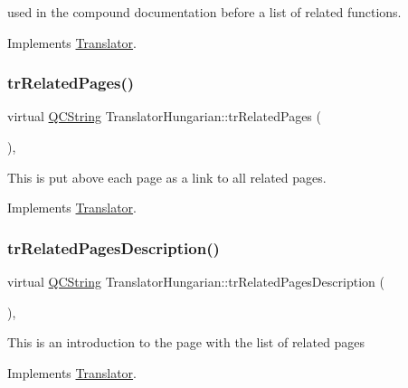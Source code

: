 used in the compound documentation before a list of related functions. 

Implements \mbox{\hyperlink{class_translator}{Translator}}.

\mbox{\label{class_translator_hungarian_a416efd9bfe237419500bd8aac47fb992}} 
\subsubsection{\texorpdfstring{trRelatedPages()}{trRelatedPages()}}
{\footnotesize\ttfamily virtual \mbox{\hyperlink{class_q_c_string}{Q\+C\+String}} Translator\+Hungarian\+::tr\+Related\+Pages (\begin{DoxyParamCaption}{ }\end{DoxyParamCaption})\hspace{0.3cm}{\ttfamily [inline]}, {\ttfamily [virtual]}}

This is put above each page as a link to all related pages. 

Implements \mbox{\hyperlink{class_translator}{Translator}}.

\mbox{\label{class_translator_hungarian_a1870d40281b97fa9a6e7cc88628a36a8}} 
\subsubsection{\texorpdfstring{trRelatedPagesDescription()}{trRelatedPagesDescription()}}
{\footnotesize\ttfamily virtual \mbox{\hyperlink{class_q_c_string}{Q\+C\+String}} Translator\+Hungarian\+::tr\+Related\+Pages\+Description (\begin{DoxyParamCaption}{ }\end{DoxyParamCaption})\hspace{0.3cm}{\ttfamily [inline]}, {\ttfamily [virtual]}}

This is an introduction to the page with the list of related pages 

Implements \mbox{\hyperlink{class_translator}{Translator}}.

\mbox{\label{class_translator_hungarian_a9a20493744bb0d3a4b058429abf06155}} 
